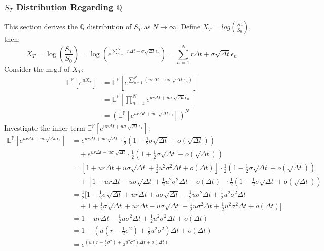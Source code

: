 \documentclass[12pt]{article}
\begin{document}
\subsubsection{$S_T$ Distribution Regarding $\mathbb{Q}$}
This section derives the $\mathbb{Q}$ distribution of $S_T$ as $N \rightarrow \infty$. Define $X_T = log(\frac{S_T}{S_0})$, then: 
\[X_T = \log(\frac{S_T}{S_0}) = \log(e^{\sum_{n=1}^N r\Delta t + \sigma \sqrt{\Delta t} \epsilon_n}) = \sum_{n=1}^N r\Delta t + \sigma \sqrt{\Delta t} \epsilon_n \]
Consider the m.g.f of $X_T$:
\begin{align*}
  \mathbb{E}^\mathbb{P}[e^{u X_T}] & =  \mathbb{E}^\mathbb{P}[e^{\sum_{n=1}^N (u r\Delta t+u\sigma \sqrt[]{\Delta t} \epsilon_n)}] \\
  & = \mathbb{E}^\mathbb{P} [\prod_{n=1}^N e^{u r\Delta t+u\sigma \sqrt[]{\Delta t} \epsilon_n}] \\
  & = (\mathbb{E}^\mathbb{P} [e^{u r\Delta t+u\sigma \sqrt[]{\Delta t} \epsilon_1}])^N \tag*{as $\epsilon_n$ is i.i.d}
\end{align*}
Investigate the inner term $\mathbb{E}^\mathbb{P} [e^{u r\Delta t+ u\sigma \sqrt[]{\Delta t} \epsilon_1}]$:
\begin{align*}
  \mathbb{E}^\mathbb{P} [e^{u r\Delta t+u\sigma \sqrt{\Delta t} \epsilon_1}] &= e^{u r\Delta t +u\sigma \sqrt{\Delta t}} \cdot \frac{1}{2} (1 - \frac{1}{2}{\sigma} \sqrt{\Delta t} + o(\sqrt{\Delta t})) \\ 
    & \quad + e^{u r\Delta t-u\sigma \sqrt[]{\Delta t}} \cdot \frac{1}{2} (1 + \frac{1}{2}{\sigma} \sqrt{\Delta t} + o(\sqrt{\Delta t})) \\
    &= [1+u r\Delta t+u \sigma \sqrt{\Delta t} +\frac{1}{2}u^2\sigma^2\Delta t + o(\Delta t)] \cdot \frac{1}{2} (1 - \frac{1}{2}{\sigma} \sqrt{\Delta t} + o(\sqrt{\Delta t})) \\ 
    & \quad + [1+u r\Delta t-u \sigma \sqrt{\Delta t} +\frac{1}{2}u^2\sigma^2\Delta t + o(\Delta t)] \cdot \frac{1}{2} (1 + \frac{1}{2}{\sigma} \sqrt{\Delta t} + o(\sqrt{\Delta t})) \\
    &= \frac{1}{2}[1 - \frac{1}{2}\sigma\sqrt{\Delta t} + ur\Delta t + u\sigma \sqrt{\Delta t} - \frac{1}{2}u\sigma^2\Delta t + \frac{1}{2}u^2\sigma^2\Delta t \\
    & \quad + 1 + \frac{1}{2}\sigma\sqrt{\Delta t} + ur\Delta t - u\sigma \sqrt{\Delta t} - \frac{1}{2}u\sigma^2\Delta t + \frac{1}{2}u^2\sigma^2\Delta t + o(\Delta t)] \\
    &= 1 + ur\Delta t - \frac{1}{2} u\sigma^2\Delta t + \frac{1}{2}u^2\sigma^2\Delta t + o(\Delta t) \\
    &= 1 + (u(r-\frac{1}{2}\sigma^2) + \frac{1}{2}u^2\sigma^2) \Delta t + o(\Delta t) \\
    &= e^{(u(r-\frac{1}{2}\sigma^2) + \frac{1}{2}u^2\sigma^2) \Delta t + o(\Delta t)}
\end{align*}
\end{document}
